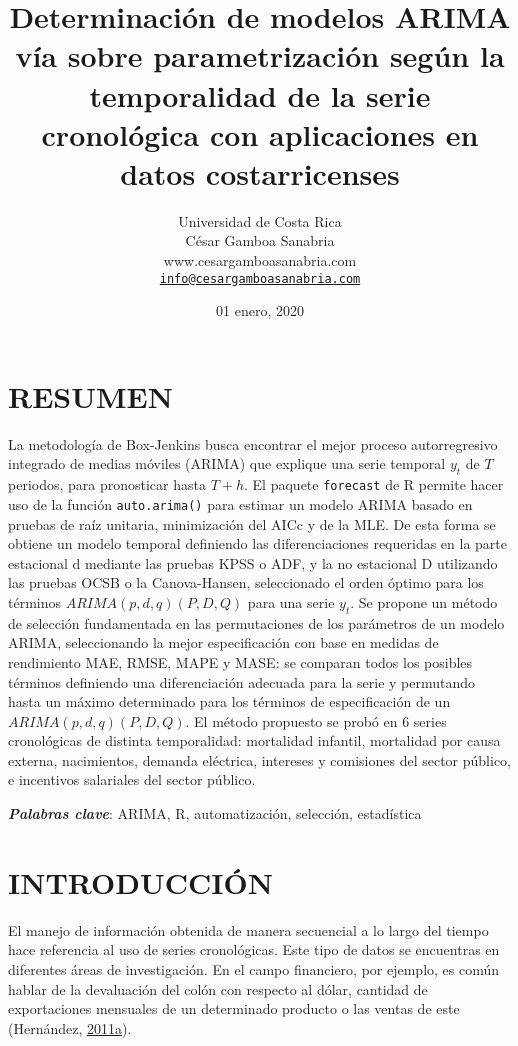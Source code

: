 \documentclass[]{article}
\title{Determinación de modelos ARIMA vía sobre parametrización según la
temporalidad de la serie cronológica con aplicaciones en datos
costarricenses}
\author{Universidad de Costa Rica\\
César Gamboa Sanabria\\
www.cesargamboasanabria.com\\
\href{mailto:info@cesargamboasanabria.com}{\nolinkurl{info@cesargamboasanabria.com}}}
\date{01 enero, 2020}
\begin{document}
\maketitle

\newpage

\section*{RESUMEN}

La metodología de Box-Jenkins busca encontrar el mejor proceso
autorregresivo integrado de medias móviles (ARIMA) que explique una
serie temporal \(y_t\) de \(T\) periodos, para pronosticar hasta
\(T+h\). El paquete \texttt{forecast} de R permite hacer uso de la
función \texttt{auto.arima()} para estimar un modelo ARIMA basado en
pruebas de raíz unitaria, minimización del AICc y de la MLE. De esta
forma se obtiene un modelo temporal definiendo las diferenciaciones
requeridas en la parte estacional d mediante las pruebas KPSS o ADF, y
la no estacional D utilizando las pruebas OCSB o la Canova-Hansen,
seleccionado el orden óptimo para los términos \(ARIMA(p,d,q)(P,D,Q)\)
para una serie \(y_t\). Se propone un método de selección fundamentada
en las permutaciones de los parámetros de un modelo ARIMA, seleccionando
la mejor especificación con base en medidas de rendimiento MAE, RMSE,
MAPE y MASE: se comparan todos los posibles términos definiendo una
diferenciación adecuada para la serie y permutando hasta un máximo
determinado para los términos de especificación de un
\(ARIMA(p,d,q)(P,D,Q)\). El método propuesto se probó en 6 series
cronológicas de distinta temporalidad: mortalidad infantil, mortalidad
por causa externa, nacimientos, demanda eléctrica, intereses y
comisiones del sector público, e incentivos salariales del sector
público.

\textbf{\emph{Palabras clave}}: ARIMA, R, automatización, selección,
estadística

\newpage

\tableofcontents

\newpage

\section{INTRODUCCIÓN}

El manejo de información obtenida de manera secuencial a lo largo del
tiempo hace referencia al uso de series cronológicas. Este tipo de datos
se encuentras en diferentes áreas de investigación. En el campo
financiero, por ejemplo, es común hablar de la devaluación del colón con
respecto al dólar, cantidad de exportaciones mensuales de un determinado
producto o las ventas de este (Hernández,
\protect\hyperlink{ref-oscarh-1}{2011}\protect\hyperlink{ref-oscarh-1}{a}).
\end{document}
